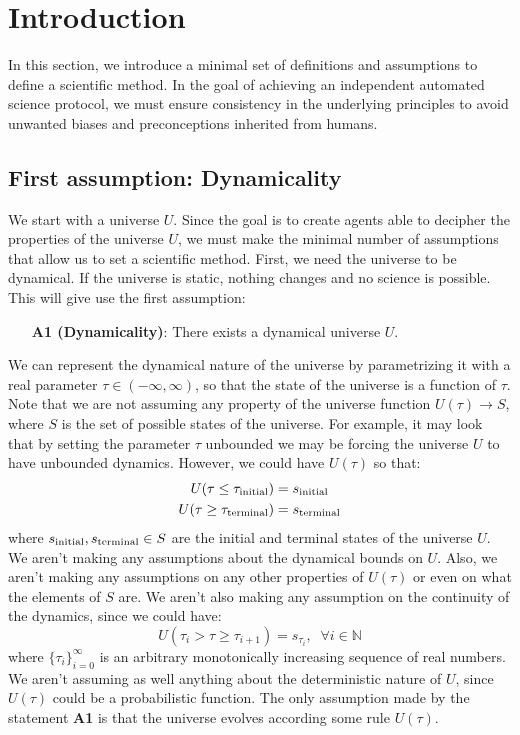 \documentclass[11pt,a4paper,twoside]{report}
\newcommand{\+}{\textnormal{+} }
\theoremstyle{definition}
\numberwithin{equation}{chapter}
\begin{document}
\section{Introduction} \label{sec:intro_science}
In this section, we introduce a minimal set of definitions and assumptions to
define a scientific method. In the goal of achieving an independent automated
science protocol, we must ensure consistency in the underlying principles to
avoid unwanted biases and preconceptions inherited from humans.
\subsection{First assumption: Dynamicality}
We start with a universe $U$. Since the goal is to create agents able to
decipher the properties of the universe $U$, we must make the minimal number of
assumptions that allow us to set a scientific method. First, we need the
universe to be dynamical. If the universe is static, nothing changes and no
science is possible. This will give use the first assumption:

\begin{itemize}
  \item[\textbf{A1 (Dynamicality)}:] There exists a dynamical universe $U$.
\end{itemize}

We can represent the dynamical nature of the universe by parametrizing it with a
real parameter $\tau \in (-\infty,\infty)$, so that the state of the universe is
a function of $\tau$. Note that we are not assuming any property of the universe
function $U(\tau)\rightarrow S$, where $S$ is the set of possible states of the
universe. For example, it may look that by setting the parameter $\tau$
unbounded we may be forcing the universe $U$ to have unbounded dynamics.
However, we could have $U(\tau)$ so that:
\begin{align*}
  U(\tau \leq \tau_{\textnormal{initial}})&=s_\text{initial} \\
  U(\tau \geq \tau_{\textnormal{terminal}})&=s_\text{terminal}
\end{align*}
where $s_\textnormal{initial}, s_\textnormal{terminal} \in S $ are the initial
and terminal states of the universe $U$. We aren't making any assumptions about
the dynamical bounds on $U$. Also, we aren't making any assumptions on any other
properties of $U(\tau)$ or even on what the elements of $S$ are. We aren't also
making any assumption on the continuity of the dynamics, since we could have:
$$U(\tau_{i} >\tau \geq \tau_{i+1})=s_{\tau_i},\;\;\forall i \in \mathbb{N}$$
where $\{\tau_i\}_{i=0}^\infty$ is an arbitrary monotonically increasing
sequence of real numbers. We aren't assuming as well anything about the
deterministic nature of $U$, since $U(\tau)$ could be a probabilistic function.
The only assumption made by the statement \textbf{A1} is that the universe
evolves according some rule $U(\tau)$.
\end{document}
